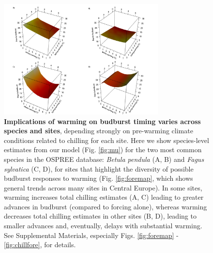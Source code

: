 \documentclass{article}
\begin{document}
\begin{figure}[h!]
\centering
\noindent \includegraphics[width=0.75\textwidth]{..//..//analyses/bb_analysis/figures/forecasting/tempforecastbothspp_1_7_degwarm_3D_utah.png}
\caption{\textbf{Implications of warming on budburst timing varies across species and sites}, depending strongly on pre-warming climate conditions related to chilling for each site. Here we show species-level estimates from our model (Fig. \ref{fig:mu}) for the two most common species in the OSPREE database: \emph{Betula pendula} (A, B) and \emph{Fagus sylvatica} (C, D), for sites that highlight the diversity of possible budburst responses to warming (Fig. \ref{fig:foremap}, which shows general trends across many sites in Central Europe). In some sites, warming increases total chilling estimates (A, C) leading to greater advances in budburst (compared to forcing alone), whereas warming decreases total chilling estimates in other sites (B, D), leading to smaller advances and, eventually, delays with substantial warming. See Supplemental Materials, especially Figs. \ref{fig:foremap} - \ref{fig:chillfore}, for details.}
\label{fig:fore}
\end{figure}

\end{document}
